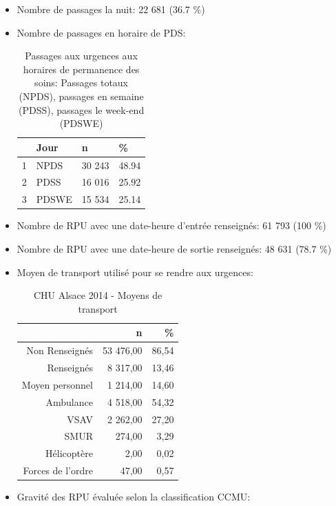 \documentclass[]{article}
\begin{document}
\begin{itemize}
\item
  Nombre de passages la nuit: 22 681 (36.7 \%)
\item
  Nombre de passages en horaire de PDS:

  \begin{table}[ht]
  \centering
  \begin{tabular}{rlll}
    \hline
   & Jour & n & \% \\ 
    \hline
  1 & NPDS & 30 243 & 48.94 \\ 
    2 & PDSS & 16 016 & 25.92 \\ 
    3 & PDSWE & 15 534 & 25.14 \\ 
     \hline
  \end{tabular}
  \caption{Passages aux urgences aux horaires de permanence des soins: Passages totaux (NPDS), passages  en semaine (PDSS), passages le week-end (PDSWE)} 
  \end{table}
\item
  Nombre de RPU avec une date-heure d'entrée renseignés: 61 793 (100 \%)
\item
  Nombre de RPU avec une date-heure de sortie renseignés: 48 631 (78.7
  \%)
\item
  Moyen de transport utilisé pour se rendre aux urgences:

  \begin{table}[ht]
  \centering
  \begin{tabular}{rrr}
    \hline
   & n & \% \\ 
    \hline
  Non Renseignés & 53 476,00 & 86,54 \\ 
    Renseignés & 8 317,00 & 13,46 \\ 
    Moyen personnel & 1 214,00 & 14,60 \\ 
    Ambulance & 4 518,00 & 54,32 \\ 
    VSAV & 2 262,00 & 27,20 \\ 
    SMUR & 274,00 & 3,29 \\ 
    Hélicoptère & 2,00 & 0,02 \\ 
    Forces de l'ordre & 47,00 & 0,57 \\ 
     \hline
  \end{tabular}
  \caption{CHU Alsace 2014 - Moyens de transport} 
  \end{table}
\item
  Gravité des RPU évaluée selon la classification CCMU:


\end{itemize}
\end{document}
